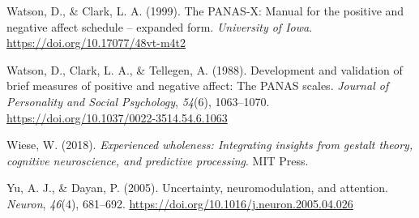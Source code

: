 \documentclass[
  jou,
  floatsintext,
  longtable,
  nolmodern,
  notxfonts,
  notimes,
  12pt,
  colorlinks=true,linkcolor=blue,citecolor=blue,urlcolor=blue]{apa7}
\newlength{\cslhangindent}
\newenvironment{CSLReferences}[2] %
 {\begin{list}{}{%
  \setlength{\itemindent}{0pt}
  \setlength{\leftmargin}{0pt}
  \setlength{\parsep}{0pt}
  \ifodd #1
   \setlength{\leftmargin}{\cslhangindent}
   \setlength{\itemindent}{-1\cslhangindent}
  \fi
  \setlength{\itemsep}{#2\baselineskip}}}
 {\end{list}}
\begin{document}
\begin{CSLReferences}{1}{0}
Watson, D., \& Clark, L. A. (1999). The {PANAS-X}: Manual for the
positive and negative affect schedule -- expanded form. \emph{University
of Iowa}. \url{https://doi.org/10.17077/48vt-m4t2}

Watson, D., Clark, L. A., \& Tellegen, A. (1988). Development and
validation of brief measures of positive and negative affect: The
{PANAS} scales. \emph{Journal of Personality and Social Psychology},
\emph{54}(6), 1063--1070.
\url{https://doi.org/10.1037/0022-3514.54.6.1063}

Wiese, W. (2018). \emph{Experienced wholeness: Integrating insights from
gestalt theory, cognitive neuroscience, and predictive processing}. MIT
Press.

Yu, A. J., \& Dayan, P. (2005). Uncertainty, neuromodulation, and
attention. \emph{Neuron}, \emph{46}(4), 681--692.
\url{https://doi.org/10.1016/j.neuron.2005.04.026}

\end{CSLReferences}
\end{document}
